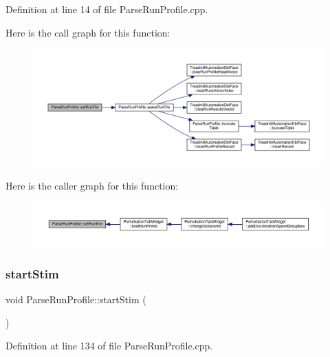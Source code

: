 Definition at line 14 of file Parse\+Run\+Profile.\+cpp.

Here is the call graph for this function\+:
\nopagebreak
\begin{figure}[H]
\begin{center}
\leavevmode
\includegraphics[width=350pt]{class_parse_run_profile_a7d1a1e31457aaac5f87067181588e8c7_cgraph}
\end{center}
\end{figure}
Here is the caller graph for this function\+:
\nopagebreak
\begin{figure}[H]
\begin{center}
\leavevmode
\includegraphics[width=350pt]{class_parse_run_profile_a7d1a1e31457aaac5f87067181588e8c7_icgraph}
\end{center}
\end{figure}
\mbox{\label{class_parse_run_profile_af1db7c8eb8b8710d98e19b8fd5c41caa}} 
\subsubsection{\texorpdfstring{start\+Stim}{startStim}}
{\footnotesize\ttfamily void Parse\+Run\+Profile\+::start\+Stim (\begin{DoxyParamCaption}{ }\end{DoxyParamCaption})\hspace{0.3cm}{\ttfamily [slot]}}



Definition at line 134 of file Parse\+Run\+Profile.\+cpp.

